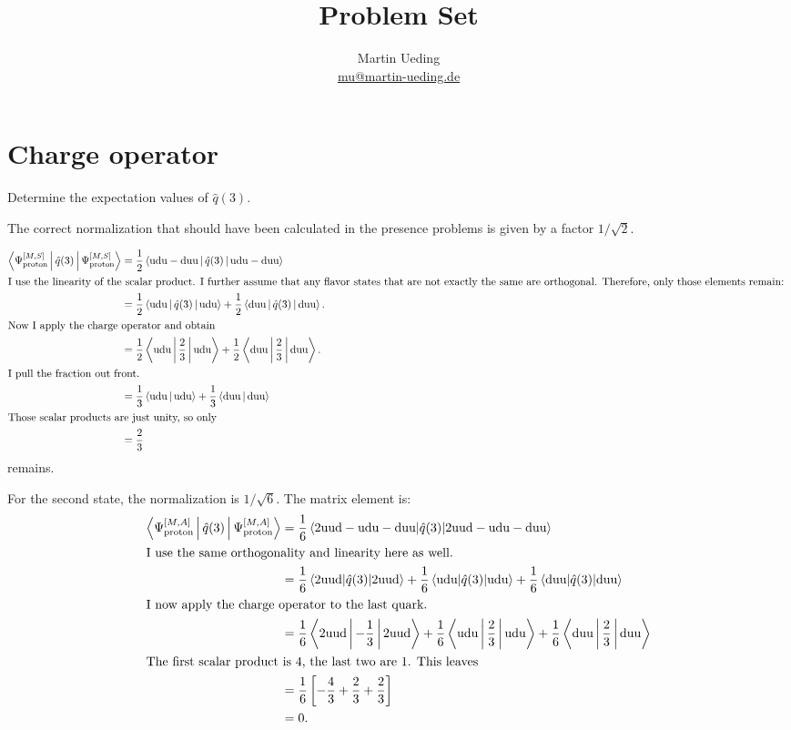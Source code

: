 \documentclass[11pt, english, fleqn, DIV=15, headinclude, BCOR=1cm]{scrartcl}
\title{Problem Set \arabic{problemset}}
\author{
    Martin Ueding \\ \small{\href{mailto:mu@martin-ueding.de}{mu@martin-ueding.de}}
}
\begin{document}
\maketitle

\section{Charge operator}

\begin{problem}
    Determine the expectation values of $\hat q(3)$.
\end{problem}

The correct normalization that should have been calculated in the presence
problems is given by a factor $1/\sqrt 2$.

\newcommand\Pp[1]{\Psi_\text{proton}^{[M,#1]}}

\begin{align*}
    \Braket{\Pp S | \hat q(3) | \Pp S}
    &= \frac 12 \Braket{\text{udu} - \text{duu} | \hat q(3) | \text{udu} - \text{duu}} \\
    \intertext{%
        I use the linearity of the scalar product. I further assume that any
        flavor states that are not exactly the same are orthogonal. Therefore,
        only those elements remain:
    }
    &= \frac 12 \Braket{\text{udu} | \hat q(3) | \text{udu}}
    + \frac 12 \Braket{\text{duu} | \hat q(3) | \text{duu}}. \\
    \intertext{%
        Now I apply the charge operator and obtain
    }
    &= \frac 12 \Braket{\text{udu} | \frac 23 | \text{udu}}
    + \frac 12 \Braket{\text{duu} | \frac 23 | \text{duu}}. \\
    \intertext{%
        I pull the fraction out front.
    }
    &= \frac 13 \Braket{\text{udu} | \text{udu}}
    + \frac 13 \Braket{\text{duu} | \text{duu}} \\
    \intertext{%
        Those scalar products are just unity, so only
    }
    &= \frac 23
\end{align*}
remains.

For the second state, the normalization is $1/\sqrt 6$. The matrix element is:
\begin{align*}
    \Braket{\Pp A | \hat q(3) | \Pp A}
    &= \frac{1}{6} \braket{2 \text{uud} - \text{udu} - \text{duu} | \hat q(3) | 2
    \text{uud} - \text{udu} - \text{duu}} \\
    \intertext{%
        I use the same orthogonality and linearity here as well.
    }
    &= \frac{1}{6} \braket{2 \text{uud} | \hat q(3) | 2 \text{uud}}
    + \frac{1}{6} \braket{\text{udu} | \hat q(3) | \text{udu}}
    + \frac{1}{6} \braket{\text{duu} | \hat q(3) | \text{duu}} \\
    \intertext{%
        I now apply the charge operator to the last quark.
    }
    &= \frac{1}{6} \Braket{2 \text{uud} | -\frac13 | 2 \text{uud}}
    + \frac{1}{6} \Braket{\text{udu} | \frac 23 | \text{udu}}
    + \frac{1}{6} \Braket{\text{duu} | \frac 23 | \text{duu}} \\
    \intertext{%
        The first scalar product is 4, the last two are 1. This leaves
    }
    &= \frac 16 \sbr{- \frac 43 + \frac 23 + \frac 23} \\
    &= 0.
\end{align*}
\end{document}
